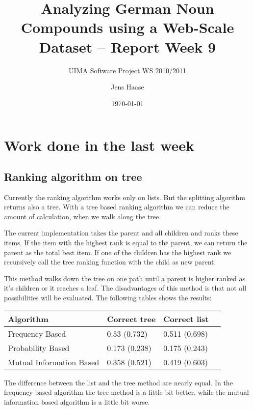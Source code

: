 \documentclass[11pt, accentcolor=tud9b, nochapname]{tudexercise}
\begin{document}
\author{Jens Haase}
\title{Analyzing German Noun Compounds using a
  Web-Scale Dataset -- Report Week 9}
\subtitle{UIMA Software Project WS 2010/2011}
\date{\today}
\maketitle

\section{Work done in the last week}

\subsection{Ranking algorithm on tree}
Currently the ranking algorithm works only on lists. But the splitting algorithm returns also a tree. With a tree based ranking algorithm we can reduce the amount of calculation, when we walk along the tree.

The current implementation takes the parent and all children and ranks these items. If the item with the highest rank is equal to the parent, we can return the parent as the total best item. If one of the children has the highest rank we recursively call the tree ranking function with the child as new parent.

This method walks down the tree on one path until a parent is higher ranked as it's children or it reaches a leaf. The disadvantages of this method is that not all possibilities will be evaluated. The following tables shows the results:

\vspace{10pt}
\begin{tabular}{l | l | l | l}
  \hline
  \textbf{Algorithm} & \textbf{Correct tree} & \textbf{Correct list} \\ \hline
  Frequency Based & 0.53 (0.732) & 0.511 (0.698) \\ \hline
  Probability Based & 0.173 (0.238) & 0.175 (0.243) \\ \hline
  Mutual Information Based & 0.358 (0.521) & 0.419 (0.603) \\ \hline
\end{tabular}
\vspace{10pt}

The difference between the list and the tree method are nearly equal. In the frequency based algorithm the tree method is a little bit better, while the mutual information based algorithm is a little bit worse.
\end{document}
